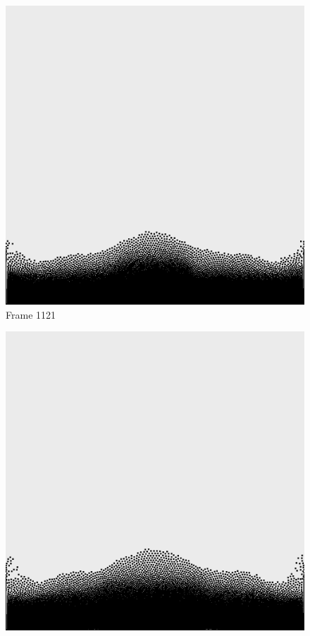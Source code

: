 \documentclass[a4paper, 12pt, oneside]{book}
\begin{document}
\begin{figure}[!ht]
    \addvspace{0.5ex}
        \begin{center}
            \includegraphics[width=\linewidth]{images/test_case_1/1121.png}
            Frame 1121
        \end{center}
    \endminipage
    \hfill
        \begin{center}
            \includegraphics[width=\linewidth]{images/test_case_1/1141.png}

\end{center}
\end{figure}
\end{document}
